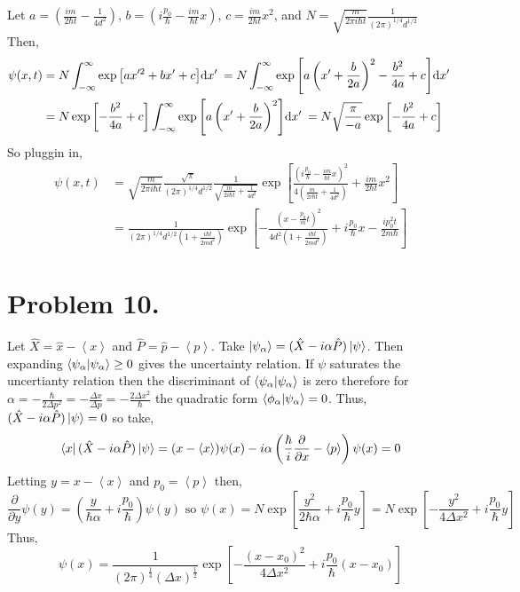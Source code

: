 \documentclass[12pt]{extarticle}
\begin{document}
\begin{enumerate}
Let $a = \left(\frac{im}{2 \hbar t} - \frac{1}{4 d^2} \right)$, $b = \left(i \frac{p_0}{\hbar} - \frac{im}{\hbar t} x \right)$, $c = \frac{im}{2\hbar t} x^2$, and $N = \sqrt{\frac{m}{2 \pi i \hbar t}} \frac{1}{(2 \pi)^{1/4} d^{1/2}}$ \\
Then,
\begin{align*}
\psi(x, t) &= N \int_{-\infty}^{\infty} \exp{\left[ a x'^2 + bx' + c \right]} \mathrm{d}x' \: = N \int_{-\infty}^{\infty}  \exp{\left[a \left(x' + \frac{b}{2a} \right)^2 - \frac{b^2}{4a} + c\right]} \mathrm{d}x' \: \\ &= N \exp{\left[- \frac{b^2}{4a} + c\right]} \int_{-\infty}^{\infty}  \exp{\left[ a \left(x' + \frac{b}{2a} \right)^2\right]} \mathrm{d}x' \: = N \sqrt{\frac{\pi}{-a}} \exp{\left[- \frac{b^2}{4a} + c\right]}
\end{align*}
So pluggin in, 
\begin{align*}
\psi(x, t) &= \sqrt{\frac{m}{2 \pi i \hbar t}} \frac{\sqrt{\pi}}{(2 \pi)^{1/4} d^{1/2}} \frac{1}{\sqrt{\frac{m}{2i \hbar t} + \frac{1}{4 d^2}}} \exp{\left[\frac{\left(i \frac{p_0}{\hbar} - \frac{im}{\hbar t} x \right)^2}{4 \left(\frac{m}{2i \hbar t} + \frac{1}{4 d^2} \right)} + \frac{im}{2\hbar t} x^2 \right]} \\ &= \frac{1}{(2 \pi)^{1/4} d^{1/2} \left(1 + \frac{i \hbar t}{2md^2} \right)} \exp{\left[ - \frac{\left(x - \frac{p_0}{m} t\right)^2}{4 d^2 \left(1 + \frac{i \hbar t}{2 m d^2} \right)} + i \frac{p_0}{\hbar}x - \frac{i p_0^2 t}{2m \hbar} \right]}
\end{align*}

\end{enumerate}

\section*{Problem 10.}

Let $\hat{X} = \hat{x} - \left<x\right>$ and $\hat{P} = \hat{p} - \left< p \right>$. Take $\left| \psi_\alpha \right> = (\hat{X} - i \alpha \hat{P}) \left| \psi \right>$. Then expanding $\left< \psi_\alpha | \psi_\alpha \right> \ge 0$ gives the uncertainty relation. If $\psi$ saturates the uncertianty relation then the discriminant of $\left< \psi_\alpha | \psi_\alpha \right>$ is zero therefore for $\alpha = -\frac{\hbar}{2 \Delta p^2} = -\frac{\Delta x}{\Delta p} = -\frac{2\Delta x^2}{\hbar}$ the quadratic form $\left< \phi_\alpha | \psi_\alpha \right> = 0$. Thus, \\ $(\hat{X} - i \alpha \hat{P}) \left| \psi \right> = 0$ so take, \[\left< x \right| (\hat{X} - i \alpha \hat{P}) \left| \psi \right> = (x - \left< x \right>) \psi(x) - i \alpha \left(\frac{\hbar}{i} \frac{\partial}{\partial x} - \left< p \right> \right) \psi(x) = 0 \]
Letting $y = x - \left< x \right>$ and $p_0 = \left< p \right>$ then, 
\[ \frac{\partial}{\partial y} \psi(y) = \left( \frac{y}{\hbar \alpha} + i \frac{p_0}{\hbar} \right) \psi(y)\text{ so } \psi(x) = N \exp{\left[ \frac{y^2}{2 \hbar \alpha} + i \frac{p_0}{\hbar} y \right]}  = N \exp{\left[ - \frac{y^2}{4 \Delta x^2} + i \frac{p_0}{\hbar} y \right]} \]
Thus, \[\psi(x) = \frac{1}{(2 \pi)^\frac{1}{4} (\Delta x)^\frac{1}{2}} \exp{\left[ -\frac{(x - x_0)^2}{4 \Delta x^2} + i \frac{p_0}{\hbar} (x - x_0) \right]}\]
\end{document}
